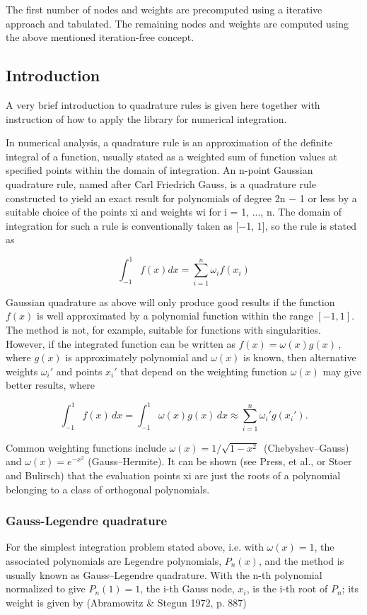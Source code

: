 The first number of nodes and weights are precomputed using a iterative approach and tabulated. The remaining nodes and weights are computed using the above mentioned iteration-\/free concept.\hypertarget{group__GL_gl_introduction}{}\subsection{Introduction}\label{group__GL_gl_introduction}
A very brief introduction to quadrature rules is given here together with instruction of how to apply the library for numerical integration.

In numerical analysis, a quadrature rule is an approximation of the definite integral of a function, usually stated as a weighted sum of function values at specified points within the domain of integration. An n-\/point Gaussian quadrature rule, named after Carl Friedrich Gauss, is a quadrature rule constructed to yield an exact result for polynomials of degree 2n − 1 or less by a suitable choice of the points xi and weights wi for i = 1, ..., n. The domain of integration for such a rule is conventionally taken as \mbox{[}−1, 1\mbox{]}, so the rule is stated as

\[ \int_{-1}^{1} f(x) dx = \sum_{i=1}^{n} \omega_i f(x_i) \]

Gaussian quadrature as above will only produce good results if the function $f(x)$ is well approximated by a polynomial function within the range $[−1, 1]$. The method is not, for example, suitable for functions with singularities. However, if the integrated function can be written as $ f(x)=\omega (x)g(x)\,$, where $g(x)$ is approximately polynomial and $\omega(x)$ is known, then alternative weights $\omega_{i}'$ and points $ x_{i}'$ that depend on the weighting function $\omega(x)$ may give better results, where

\[ \int_{-1}^{1}f(x)\,dx=\int_{-1}^{1}\omega (x)g(x)\,dx\approx \sum_{i=1}^{n}\omega_{i}'g(x_{i}'). \]

Common weighting functions include $ \omega (x)=1/{\sqrt {1-x^{2}}}\,$ (Chebyshev–\+Gauss) and $\omega (x)=e^{-x^{2}}$ (Gauss–\+Hermite). It can be shown (see Press, et al., or Stoer and Bulirsch) that the evaluation points xi are just the roots of a polynomial belonging to a class of orthogonal polynomials.\hypertarget{group__GL_gl_gl_quadrature}{}\subsubsection{Gauss-\/\+Legendre quadrature}\label{group__GL_gl_gl_quadrature}
For the simplest integration problem stated above, i.\+e. with $\omega (x)=1$, the associated polynomials are Legendre polynomials, $P_n(x)$, and the method is usually known as Gauss–\+Legendre quadrature. With the n-\/th polynomial normalized to give $P_n(1) = 1$, the i-\/th Gauss node, $x_i$, is the i-\/th root of $P_n$; its weight is given by (Abramowitz \& Stegun 1972, p. 887)

